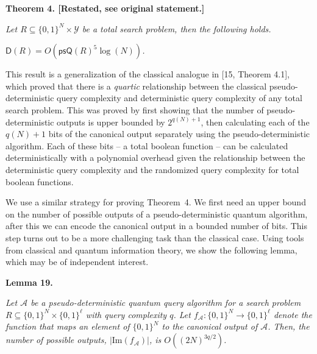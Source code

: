 \documentclass[10pt,a4paper]{article}
\begin{document}
\par\medskip\noindent\textbf{
\textbf{Theorem 4}\textbf{.}
[Restated, see original statement.]}\par



\emph{Let ${R}\subseteq\{0,1\}^{N}\times\mathcal{Y}$ be a total search problem, then the following holds.}\par




$\mathsf{D}(R)=O(\mathsf{psQ}(R)^{5}\log(N))$\emph{.}\par







This result is a generalization of the classical analogue in [15, Theorem 4.1], which proved that there is a \emph{quartic} relationship between the classical pseudo-deterministic query complexity and deterministic query complexity of any total search problem. This was proved by first showing that the number of pseudo-deterministic outputs is upper bounded by $2^{q(N)+1}$, then calculating each of the $q(N)+1$ bits of the canonical output separately using the pseudo-deterministic algorithm. Each of these bits – a total boolean function – can be calculated deterministically with a polynomial overhead given the relationship between the deterministic query complexity and the randomized query complexity for total boolean functions.\par




We use a similar strategy for proving Theorem 4. We first need an upper bound on the number of possible outputs of a pseudo-deterministic quantum algorithm, after this we can encode the canonical output in a bounded number of bits.
This step turns out to be a more challenging task than the classical case. Using tools from classical and quantum information theory, we show the following lemma, which may be of independent interest.\par





\par\medskip\noindent\textbf{
\textbf{Lemma 19}\textbf{.}
}\par



\emph{Let $\mathcal{A}$ be a pseudo-deterministic quantum query algorithm for a search problem $R\subseteq\{0,1\}^{N}\times\{0,1\}^{\ell}$ with query complexity $q$. Let $f_{\mathcal{A}}:\{0,1\}^{N}\rightarrow\{0,1\}^{\ell}$
denote the function that maps an element of $\{0,1\}^{N}$ to the canonical output of $\mathcal{A}$.
Then, the number of possible outputs, $|\mathrm{Im}(f_{\mathcal{A}})|$, is $O((2N)^{3q/2})$.}\par
\end{document}
